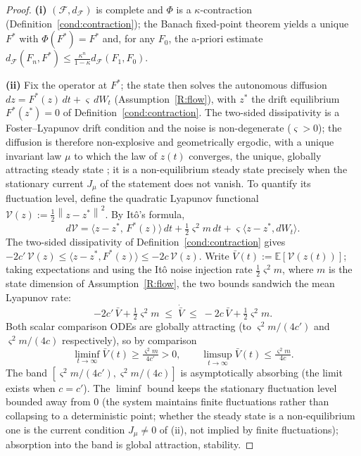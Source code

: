 \documentclass[11pt]{article}
\theoremstyle{plain}
\theoremstyle{definition}
\theoremstyle{remark}
\newcommand{\E}{\mathbb{E}}
\newcommand{\norm}[1]{\left\lVert#1\right\rVert}
\begin{document}
\begin{proof}
\textbf{(i)} $(\mathcal F,d_{\mathcal F})$ is complete and $\Phi$ is a $\kappa$-contraction (Definition~\ref{cond:contraction}); the Banach fixed-point theorem \citep{banach1922} yields a unique $F^*$ with $\Phi(F^*)=F^*$ and, for any $F_0$, the a-priori estimate $d_{\mathcal F}(F_n,F^*)\le\frac{\kappa^n}{1-\kappa}d_{\mathcal F}(F_1,F_0)$.

\textbf{(ii)} Fix the operator at $F^*$; the state then solves the autonomous diffusion $dz=F^*(z)\,dt+\varsigma\,dW_t$ (Assumption~\ref{R:flow}), with $z^*$ the drift equilibrium $F^*(z^*)=0$ of Definition~\ref{cond:contraction}. The two-sided dissipativity is a Foster--Lyapunov drift condition and the noise is non-degenerate ($\varsigma>0$); the diffusion is therefore non-explosive and geometrically ergodic, with a unique invariant law $\mu$ to which the law of $z(t)$ converges, the unique, globally attracting steady state \citep{khasminskii2012,mattingly2002}; it is a non-equilibrium steady state precisely when the stationary current $J_\mu$ of the statement does not vanish. To quantify its fluctuation level, define the quadratic Lyapunov functional $\mathcal V(z):=\tfrac12\norm{z-z^*}^2$. By It\^o's formula,
\[
d\mathcal V=\big\langle z-z^*,\,F^*(z)\big\rangle\,dt+\tfrac12\varsigma^2 m\,dt+\varsigma\langle z-z^*,dW_t\rangle .
\]
The two-sided dissipativity of Definition~\ref{cond:contraction} gives $-2c'\,\mathcal V(z)\le\langle z-z^*,F^*(z)\rangle\le-2c\,\mathcal V(z)$. Write $\bar V(t):=\E[\mathcal V(z(t))]$; taking expectations and using the It\^o noise injection rate $\tfrac12\varsigma^2 m$, where $m$ is the state dimension of Assumption~\ref{R:flow}, the two bounds sandwich the mean Lyapunov rate:
\[
-2c'\,\bar V+\tfrac12\varsigma^2 m\;\le\;\dot{\bar V}\;\le\;-2c\,\bar V+\tfrac12\varsigma^2 m .
\]
Both scalar comparison ODEs are globally attracting (to $\varsigma^2 m/(4c')$ and $\varsigma^2 m/(4c)$ respectively), so by comparison
\[
\liminf_{t\to\infty}\bar V(t)\ge\tfrac{\varsigma^2 m}{4c'}>0,\qquad \limsup_{t\to\infty}\bar V(t)\le\tfrac{\varsigma^2 m}{4c}.
\]
The band $[\varsigma^2 m/(4c'),\varsigma^2 m/(4c)]$ is asymptotically absorbing (the limit exists when $c=c'$). The $\liminf$ bound keeps the stationary fluctuation level bounded away from $0$ (the system maintains finite fluctuations rather than collapsing to a deterministic point; whether the steady state is a non-equilibrium one is the current condition $J_\mu\neq0$ of (ii), not implied by finite fluctuations); absorption into the band is global attraction, stability.


\end{proof}
\end{document}
